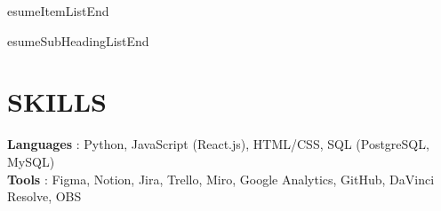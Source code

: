\documentclass[letterpaper,11pt]{article}
\begin{document}
esumeItemListEnd
          
    
esumeSubHeadingListEnd
\section{SKILLS} 
 \begin{itemize}[leftmargin=0in, label={}] 
    \small{\item{ 
     \textbf{Languages} {: Python, JavaScript (React.js), HTML/CSS, SQL (PostgreSQL, MySQL)}\vspace{2pt} \\ 
     \textbf{Tools}     {: Figma, Notion, Jira, Trello, Miro, Google Analytics, GitHub, DaVinci Resolve, OBS} 
    }} 
 \end{itemize}
\end{document}
